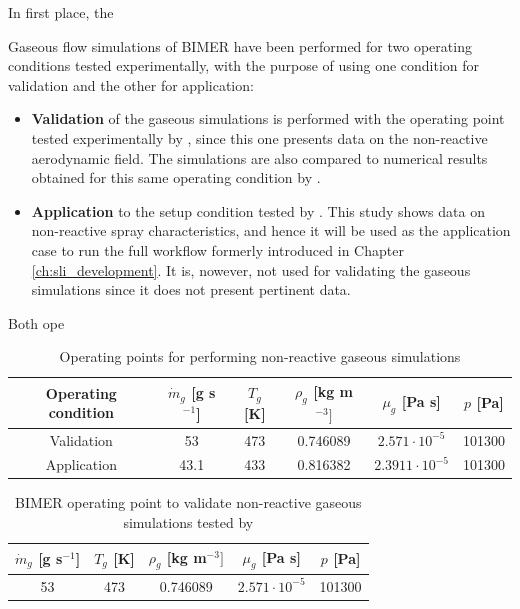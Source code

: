 In first place, the 

Gaseous flow simulations of BIMER have been performed for two operating conditions tested experimentally, with the purpose of using one condition for validation and the other for application:

\begin{itemize}

	\item \textbf{Validation} of the gaseous simulations is performed with the operating point tested experimentally by , since this one presents data on the non-reactive aerodynamic field. The simulations are also compared to numerical results obtained for this same operating condition by . 
	
	\item \textbf{Application} to the setup condition tested by . This study shows data on non-reactive spray characteristics, and hence it will be used as the application case to run the full workflow formerly introduced in Chapter \ref{ch:sli_development}. It is, nowever, not used for validating the gaseous simulations since it does not present pertinent data.

\end{itemize}

Both ope

\begin{table}[!h]
\centering
\caption{Operating points for performing non-reactive gaseous simulations}
\begin{tabular}{|c|c|c|c|c|c|}
\hline
Operating condition   &  $\dot{m}_g$ [g s$^{-1}$] & $T_g$ [K] & $\rho_g$ [kg m$^{-3}]$  & $\mu_g$ [Pa s] & $p$ [Pa]  \\
\hline
\hline
Validation  & 53 & 473 & 0.746089 & $2.571 \cdot 10^{-5}$ & 101300 \\
\hline
Application  & 43.1 & 433 & 0.816382 & $2.3911 \cdot 10^{-5}$ & 101300 \\
\hline
\end{tabular}
\label{tab:gaseous_operating_points_BIMER}
\end{table}

\begin{table}[!h]
\centering
\caption{BIMER operating point to validate non-reactive gaseous simulations tested by }
\begin{tabular}{|c|c|c|c|c|}
\hline
$\dot{m}_g$ [g s$^{-1}$] & $T_g$ [K] & $\rho_g$ [kg m$^{-3}]$  & $\mu_g$ [Pa s] & $p$ [Pa]  \\
\hline
\hline
53 & 473 & 0.746089 & $2.571 \cdot 10^{-5}$ & 101300 \\
\hline
\end{tabular}
\label{tab:gaseous_operating_point_Providakis}
\end{table}



